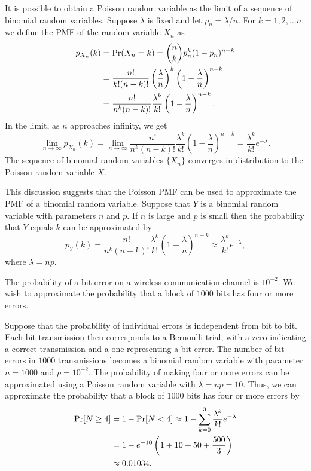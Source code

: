 It is possible to obtain a Poisson random variable as the limit of a sequence of binomial random variables.
Suppose $\lambda$ is fixed and let $p_n = \lambda/n$.
For $k = 1, 2, \ldots n$, we define the PMF of the random variable $X_n$ as
\begin{equation*}
\begin{split}
p_{X_n} (k) &= \Pr (X_n = k)
= \binom{n}{k} p_n^k (1-p_n)^{n-k} \\
&= \frac{n!}{k!(n-k)!} \left( \frac{\lambda}{n} \right)^k
\left( 1 - \frac{\lambda}{n} \right)^{n-k} \\
&= \frac{n!}{n^k (n-k)!} \frac{\lambda^k}{k!}
\left( 1 - \frac{\lambda}{n} \right)^{n-k} .
\end{split}
\end{equation*}
In the limit, as $n$ approaches infinity, we get
\begin{equation*}
\lim_{n \rightarrow \infty} p_{X_n} (k)
= \lim_{n \rightarrow \infty} \frac{n!}{n^k (n-k)!} \frac{\lambda^k}{k!}
\left( 1 - \frac{\lambda}{n} \right)^{n-k}
= \frac{\lambda^k}{k!} e^{- \lambda} .
\end{equation*}
The sequence of binomial random variables $\{ X_n \}$ converges in distribution to the Poisson random variable $X$.

This discussion suggests that the Poisson PMF can be used to approximate the PMF of a binomial random variable.
Suppose that $Y$ is a binomial random variable with parameters $n$ and $p$.
If $n$ is large and $p$ is small then the probability that $Y$ equals $k$ can be approximated by
\begin{equation*}
p_{Y} (k) = \frac{n!}{n^k (n-k)!} \frac{\lambda^k}{k!}
\left( 1 - \frac{\lambda}{n} \right)^{n-k}
\approx \frac{\lambda^k}{k!} e^{- \lambda} ,
\end{equation*}
where $\lambda = n p$.

\begin{example}
The probability of a bit error on a wireless communication channel is $10^{-2}$.
We wish to approximate the probability that a block of $1000$ bits has four or more errors.

Suppose that the probability of individual errors is independent from bit to bit.
Each bit transmission then corresponds to a Bernoulli trial, with a zero indicating a correct transmission and a one representing a bit error.
The number of bit errors in $1000$ transmissions becomes a binomial random variable with parameter $n = 1000$ and $p = 10^{-2}$.
The probability of making four or more errors can be approximated using a Poisson random variable with $\lambda = np = 10$.
Thus, we can approximate the probability that a block of $1000$ bits has four or more errors by
\begin{equation*}
\begin{split}
\Pr [ N \geq 4 ] &= 1 - \Pr [ N < 4 ]
\approx 1 - \sum_{k=0}^3 \frac{\lambda^k}{k!} e^{-\lambda} \\
&= 1 - e^{-10} \left( 1 + 10 + 50 + \frac{500}{3} \right) \\
&\approx 0.01034 .
\end{split}
\end{equation*}
\end{example}


